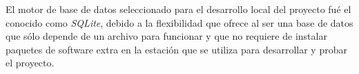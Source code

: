 El motor de base de datos seleccionado para el desarrollo local del proyecto fué el conocido como \textit{SQLite}, debido a la flexibilidad que ofrece al ser una base de datos que sólo depende de un archivo para funcionar y que no requiere de instalar paquetes de software extra en la estación que se utiliza para desarrollar y probar el proyecto.
